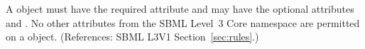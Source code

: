 A \RateRule object must have the required attribute  and
may have the optional attributes  and .  No
other attributes from the SBML Level~3 Core namespace are permitted on a
\RateRule object.  (References: SBML L3V1 Section~\ref{sec:rules}.)
